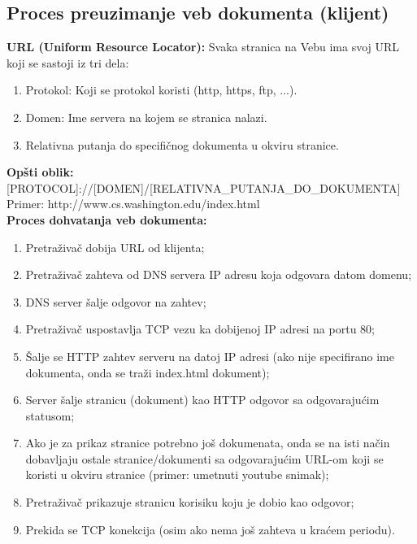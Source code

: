 \documentclass[a4paper]{article}
\begin{document}
    \subsection{Proces preuzimanje veb dokumenta (klijent) }
        \textbf{URL (Uniform Resource Locator):} Svaka stranica na Vebu ima svoj URL koji se 
        sastoji iz tri dela:
        \begin{enumerate}
            \item Protokol: Koji se protokol koristi (http, https, ftp, ...).
            \item Domen: Ime servera na kojem se stranica nalazi.
            \item Relativna putanja do specifičnog dokumenta u okviru stranice.
        \end{enumerate}
        \textbf{Opšti oblik:} [PROTOCOL]://[DOMEN]/[RELATIVNA\_PUTANJA\_DO\_DOKUMENTA]\\
        Primer: http://www.cs.washington.edu/index.html\\

        \noindent \textbf{Proces dohvatanja veb dokumenta:}
        \begin{enumerate}
            \item Pretraživač dobija URL od klijenta;
            \item Pretraživač zahteva od DNS servera IP adresu koja odgovara datom domenu;
            \item DNS server šalje odgovor na zahtev;
            \item Pretraživač uspostavlja TCP vezu ka dobijenoj IP adresi na portu 80;
            \item Šalje se HTTP zahtev serveru na datoj IP adresi (ako nije specifirano ime dokumenta,
                  onda se traži index.html dokument);
            \item Server šalje stranicu (dokument) kao HTTP odgovor sa odgovarajućim statusom;
            \item Ako je za prikaz stranice potrebno još dokumenata, onda se na isti način
                  dobavljaju ostale stranice/dokumenti sa odgovarajućim URL-om koji se koristi 
                  u okviru stranice (primer: umetnuti youtube snimak);
            \item Pretraživač prikazuje stranicu korisiku koju je dobio kao odgovor;
            \item Prekida se TCP konekcija (osim ako nema još zahteva u kraćem periodu).
        \end{enumerate}
\end{document}

